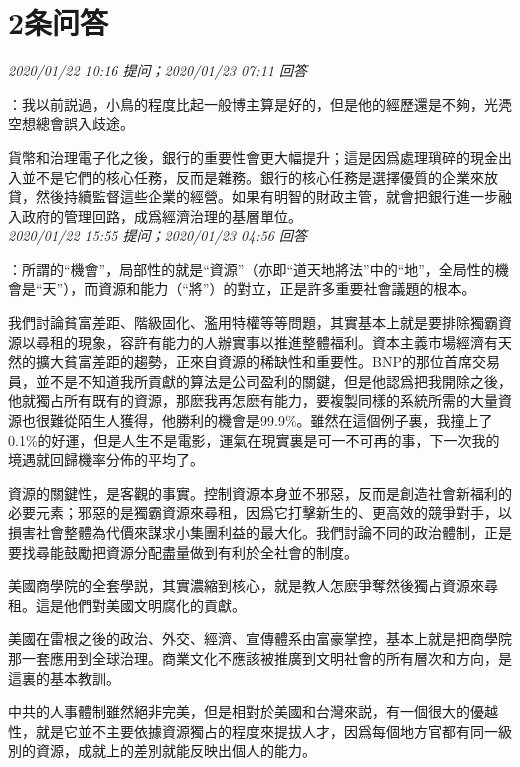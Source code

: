 \documentclass[twocolumn]{ctexart}
\begin{document}
\section{2条问答}

\textit{\hfill\noindent\small 2020/01/22 10:16 提问；2020/01/23 07:11 回答}

：我以前説過，小鳥的程度比起一般博主算是好的，但是他的經歷還是不夠，光凴空想總會誤入歧途。

貨幣和治理電子化之後，銀行的重要性會更大幅提升；這是因爲處理瑣碎的現金出入並不是它們的核心任務，反而是雜務。銀行的核心任務是選擇優質的企業來放貸，然後持續監督這些企業的經營。如果有明智的財政主管，就會把銀行進一步融入政府的管理回路，成爲經濟治理的基層單位。
\\

\textit{\hfill\noindent\small 2020/01/22 15:55 提问；2020/01/23 04:56 回答}

：所謂的“機會”，局部性的就是“資源”（亦即“道天地將法”中的“地”，全局性的機會是“天”），而資源和能力（“將”）的對立，正是許多重要社會議題的根本。

我們討論貧富差距、階級固化、濫用特權等等問題，其實基本上就是要排除獨霸資源以尋租的現象，容許有能力的人辦實事以推進整體福利。資本主義市場經濟有天然的擴大貧富差距的趨勢，正來自資源的稀缺性和重要性。BNP的那位首席交易員，並不是不知道我所貢獻的算法是公司盈利的關鍵，但是他認爲把我開除之後，他就獨占所有既有的資源，那麽我再怎麽有能力，要複製同樣的系統所需的大量資源也很難從陌生人獲得，他勝利的機會是99.9\%。雖然在這個例子裏，我撞上了0.1\%的好運，但是人生不是電影，運氣在現實裏是可一不可再的事，下一次我的境遇就回歸機率分佈的平均了。

資源的關鍵性，是客觀的事實。控制資源本身並不邪惡，反而是創造社會新福利的必要元素；邪惡的是獨霸資源來尋租，因爲它打擊新生的、更高效的競爭對手，以損害社會整體為代價來謀求小集團利益的最大化。我們討論不同的政治體制，正是要找尋能鼓勵把資源分配盡量做到有利於全社會的制度。

美國商學院的全套學説，其實濃縮到核心，就是教人怎麽爭奪然後獨占資源來尋租。這是他們對美國文明腐化的貢獻。

美國在雷根之後的政治、外交、經濟、宣傳體系由富豪掌控，基本上就是把商學院那一套應用到全球治理。商業文化不應該被推廣到文明社會的所有層次和方向，是這裏的基本教訓。

中共的人事體制雖然絕非完美，但是相對於美國和台灣來説，有一個很大的優越性，就是它並不主要依據資源獨占的程度來提拔人才，因爲每個地方官都有同一級別的資源，成就上的差別就能反映出個人的能力。
\end{document}
